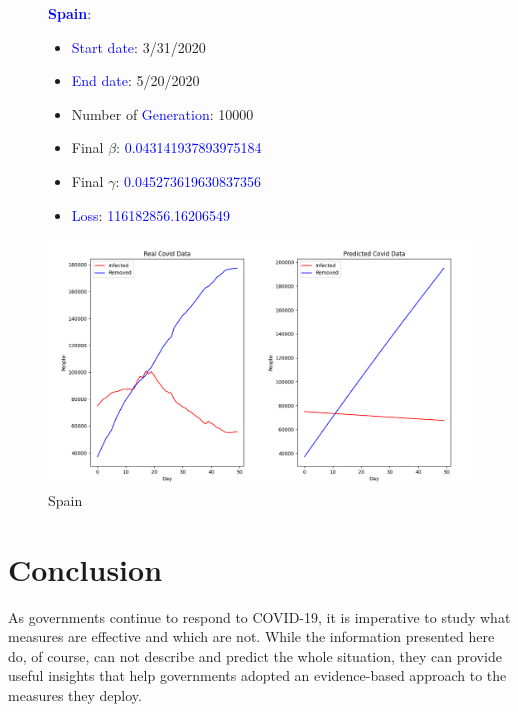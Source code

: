 \documentclass[a4paper]{article}
\begin{document}
    \begin{figure}[ht]
    \centering
    \textbf{\textcolor{blue}{Spain}}: 
    \begin{itemize}
        \item \textcolor{blue}{Start date}: 3/31/2020
        \item \textcolor{blue}{End date}: 5/20/2020
        \item Number of \textcolor{blue}{Generation}: 10000
        \item Final $\beta$: \textcolor{blue}{0.043141937893975184}
        \item Final $\gamma$: \textcolor{blue}{0.045273619630837356}
        \item \textcolor{blue}{Loss}: \textcolor{blue}{116182856.16206549}
    \end{itemize}
    \includegraphics[width= \linewidth]{ex5-plot/Spain.png}
    \caption{Spain}
    \end{figure}
    
    \clearpage
    \section{Conclusion}
    As governments continue to respond to COVID-19, it is imperative to study what measures are effective and which are not. While the information presented here do, of course, can not describe and predict the whole situation, they can provide useful insights that help governments adopted an evidence-based approach to the measures they deploy.
\end{document}
